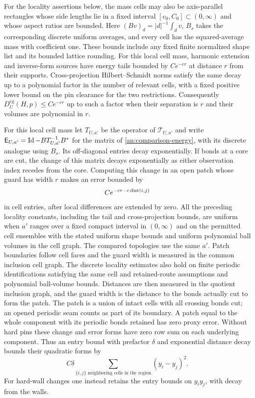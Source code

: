 \begin{proposition}
For the locality assertions below, the mass cells may also be
axis-parallel rectangles whose side lengths lie in a fixed interval
$[c_0,C_0]\subset(0,\infty)$ and whose aspect ratios are bounded.
Here $(Bv)_d=|d|^{-1}\int_d v$, $B_s$ takes the corresponding
discrete uniform averages, and every cell has the squared-average
mass with coefficient one.  These bounds include any fixed finite
normalized shape list and its bounded lattice rounding.
For this local cell mass, harmonic extension and inverse-form
sources have energy tails bounded by $Ce^{-cr}$ at
distance $r$ from their supports.  Cross-projection
Hilbert--Schmidt norms satisfy the same decay up to a
polynomial factor in the number of relevant cells, with a fixed
positive lower bound on the pin clearance for the two restrictions.
Consequently $D_U^{\mathrm{cg}}(H,p)\le Ce^{-cr}$ up to
such a factor when their separation is $r$ and their
volumes are polynomial in $r$.

For this local cell mass let $T_{U,a'}$ be the operator of
$\mathcal T_{U,a'}$ and write
$\mathsf E_{U,a'}=\operatorname{Id}-BT_{U,a'}^{-1}B^*$ for the matrix of
\eqref{an:comparison-energy}, with its discrete analogue
using $B_s$.  Its off-diagonal entries decay exponentially.
If bonds at a core are cut, the change of this matrix
decays exponentially as either observation index recedes
from the core.  Computing this change in an open patch
whose guard has width $r$ makes an error bounded by
\begin{equation}
 C e^{-cr-c\operatorname{dist}(i,j)}
 \label{an:local-energy-error}
\end{equation}
in cell entries, after local differences are extended by
zero.  All the preceding locality constants, including
the tail and cross-projection bounds, are uniform when $a'$ ranges over
a fixed compact interval in $(0,\infty)$ and on the permitted
cell ensembles with the stated uniform shape bounds and uniform
polynomial ball volumes in the cell graph.  The compared topologies use
the same $a'$.  Patch boundaries follow
cell faces and the guard width is measured in the common inclusion
cell graph.  The discrete locality estimates also hold on finite
periodic identifications satisfying the same cell and retained-route
assumptions and polynomial ball-volume bounds.  Distances are then
measured in the quotient inclusion graph, and the guard width is
the distance to the bonds actually cut to form the patch.  The patch
is a union of intact cells with all crossing bonds cut; an opened
periodic seam counts as part of its boundary.  A patch equal to the
whole component with its periodic bonds retained has zero proxy error.
Without hard pins these
change and error forms have zero row sum on each
underlying component.  Thus an entry bound with prefactor
$\delta$ and exponential distance decay bounds their
quadratic forms by
\begin{equation}
 C\delta\sum_{\{i,j\}\text{ neighboring cells in the region}}
                       (y_i-y_j)^2.
 \label{an:row-sum-gradient}
\end{equation}
For hard-wall changes one instead retains the entry
bounds on $y_i y_j$, with decay from the walls.
\end{proposition}

